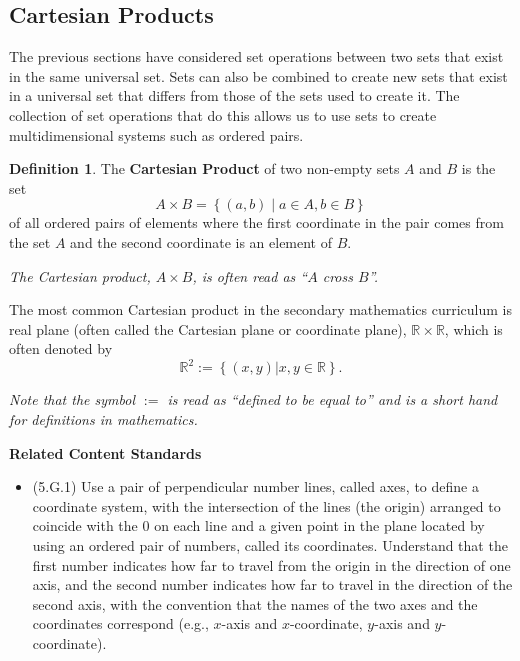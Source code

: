 \documentclass[
]{book}
\providecommand{\tightlist}{%
  \setlength{\itemsep}{0pt}\setlength{\parskip}{0pt}}
\newenvironment{standards}{}{}
\theoremstyle{definition}
\newtheorem{definition}{Definition}[chapter]
\theoremstyle{definition}
\theoremstyle{definition}
\theoremstyle{definition}
\theoremstyle{remark}
\begin{document}
\hypertarget{cartesian}{%
\subsection{Cartesian Products}\label{cartesian}}

The previous sections have considered set operations between two sets that exist in the same universal set. Sets can also be combined to create new sets that exist in a universal set that differs from those of the sets used to create it. The collection of set operations that do this allows us to use sets to create multidimensional systems such as ordered pairs.

\begin{definition}
\protect\hypertarget{def:cartesian-product}{}\label{def:cartesian-product}The \textbf{Cartesian Product} of two non-empty sets \(A\) and \(B\) is the set
\[A\times B = \left\{ (a,b) \middle \vert a \in A, b\in B\right\}\] of all ordered pairs of elements where the first coordinate in the pair comes from the set \(A\) and the second coordinate is an element of \(B\).
\end{definition}

\emph{The Cartesian product, \(A\times B\), is often read as ``\(A\) cross \(B\)''.}

The most common Cartesian product in the secondary mathematics curriculum is real plane (often called the Cartesian plane or coordinate plane), \(\mathbb{R} \times \mathbb{R}\), which is often denoted by \[\mathbb{R}^2:= \left\{ (x,y) \vert x,y\in \mathbb{R} \right\}.\]

\emph{Note that the symbol \(:=\) is read as ``defined to be equal to'' and is a short hand for definitions in mathematics.}

\begin{standards}

\begin{center}
\textbf{Related Content Standards}

\end{center}

\begin{itemize}
\tightlist
\item
  (5.G.1) Use a pair of perpendicular number lines, called axes, to define a coordinate system, with the intersection of the lines (the origin) arranged to coincide with the \(0\) on each line and a given point in the plane located by using an ordered pair of numbers, called its coordinates. Understand that the first number indicates how far to travel from the origin in the direction of one axis, and the second number indicates how far to travel in the direction of the second axis, with the convention that the names of the two axes and the coordinates correspond (e.g., \(x\)-axis and \(x\)-coordinate, \(y\)-axis and \(y\)-coordinate).
\end{itemize}

\end{standards}
\end{document}
